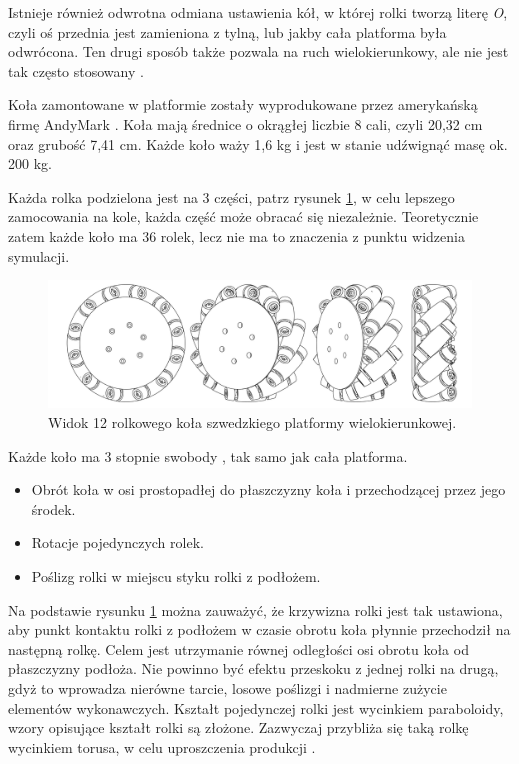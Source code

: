 	Istnieje również odwrotna odmiana ustawienia kół, w której rolki tworzą literę \emph{O}, 
	czyli oś przednia jest zamieniona z tylną, lub jakby cała platforma była odwrócona.
	Ten drugi sposób także pozwala na ruch wielokierunkowy, ale nie jest tak często stosowany \cite{paletobot}.
	
	Koła zamontowane w platformie zostały wyprodukowane przez amerykańską firmę AndyMark \cite{andymark}.
	Koła mają średnice o okrągłej liczbie 8 cali, czyli 20,32 \si{\centi\metre} oraz grubość 7,41 \si{\centi\metre}.
	Każde koło waży 1,6 \si{\kilo\gram} i jest w stanie udźwignąć masę ok. 200 \si{\kilo\gram}.
	
	Każda rolka podzielona jest na 3 części, patrz rysunek \ref{fig:wheel}, w celu lepszego zamocowania na kole, każda część może obracać się niezależnie.
	Teoretycznie zatem każde koło ma 36 rolek, lecz nie ma to znaczenia z punktu widzenia symulacji.

	\begin{figure}[H]
	\centering
	\includegraphics[width=\textwidth]{graphics/wheel.pdf}
	\caption{Widok 12 rolkowego koła szwedzkiego platformy wielokierunkowej.}
	\label{fig:wheel}
	\end{figure} 

	Każde koło ma 3 stopnie swobody \cite{kinematic_modeling}, tak samo jak cała platforma.
	\begin{itemize}
		\item Obrót koła w osi prostopadłej do płaszczyzny koła i przechodzącej przez jego środek.
		\item Rotacje pojedynczych rolek.
		\item Poślizg rolki w miejscu styku rolki z podłożem.
	\end{itemize}

	Na podstawie rysunku \ref{fig:wheel} można zauważyć, że krzywizna rolki jest tak ustawiona, aby punkt kontaktu rolki z podłożem w czasie obrotu koła płynnie przechodził na następną rolkę.
	Celem jest utrzymanie równej odległości osi obrotu koła od płaszczyzny podłoża.
	Nie powinno być efektu przeskoku z jednej rolki na drugą, gdyż to wprowadza nierówne tarcie, losowe poślizgi i nadmierne zużycie elementów wykonawczych.
	Kształt pojedynczej rolki jest wycinkiem paraboloidy, wzory opisujące kształt rolki są złożone.
	Zazwyczaj przybliża się taką rolkę wycinkiem torusa, w celu uproszczenia produkcji \cite{rollers}.

